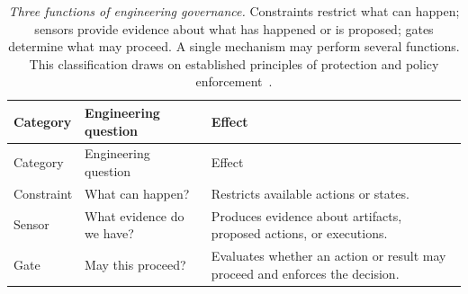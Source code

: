{\footnotesize
\begin{longtable}[]{@{}
  >{\raggedright\arraybackslash}p{}
  >{\raggedright\arraybackslash}p{}
  >{\raggedright\arraybackslash}p{}@{}}
\caption[Three functions of engineering governance]{\emph{Three functions of engineering governance.} Constraints restrict what can happen; sensors provide evidence about what has happened or is proposed; gates determine what may proceed. A single mechanism may perform several functions. This classification draws on established principles of protection and policy enforcement~\citep{saltzer1975protection, rfc2753, oasis2017xacml}.}\label{governance-mechanism-questions}\tabularnewline
\toprule\noalign{}
\begin{minipage}[b]{\linewidth}\raggedright
Category
\end{minipage} & \begin{minipage}[b]{\linewidth}\raggedright
Engineering question
\end{minipage} & \begin{minipage}[b]{\linewidth}\raggedright
Effect
\end{minipage} \\
\midrule\noalign{}
\endfirsthead
\toprule\noalign{}
\begin{minipage}[b]{\linewidth}\raggedright
Category
\end{minipage} & \begin{minipage}[b]{\linewidth}\raggedright
Engineering question
\end{minipage} & \begin{minipage}[b]{\linewidth}\raggedright
Effect
\end{minipage} \\
\midrule\noalign{}
\endhead
\bottomrule\noalign{}
\endlastfoot
Constraint & What can happen? & Restricts available actions or states. \\
Sensor & What evidence do we have? & Produces evidence about artifacts, proposed actions, or executions. \\
Gate & May this proceed? & Evaluates whether an action or result may proceed and enforces the decision. \\
\end{longtable}
}



